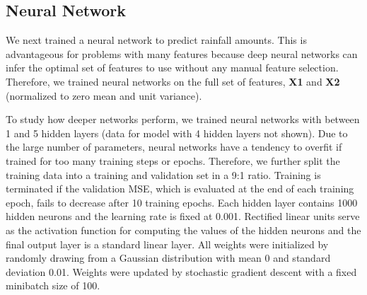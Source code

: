 \documentclass[12pt] {article}
\begin{document}
\subsection{Neural Network}
We next trained a neural network to predict rainfall amounts. This is advantageous for problems with many features because deep neural networks can infer the optimal set of features to use without any manual feature selection. Therefore, we trained neural networks on the full set of features, \textbf{X1} and \textbf{X2} (normalized to zero mean and unit variance).

To study how deeper networks perform, we trained neural networks with between 1 and 5 hidden layers (data for model with 4 hidden layers not shown). Due to the large number of parameters, neural networks have a tendency to overfit if trained for too many training steps or epochs. Therefore, we further split the training data into a training and validation set in a 9:1 ratio. Training is terminated if the validation MSE, which is evaluated at the end of each training epoch, fails to decrease after 10 training epochs. Each hidden layer contains 1000 hidden neurons and the learning rate is fixed at 0.001. Rectified linear units serve as the activation function for computing the values of the hidden neurons and the final output layer is a standard linear layer. All weights were initialized by randomly drawing from a Gaussian distribution with mean 0 and standard deviation 0.01. Weights were updated by stochastic gradient descent with a fixed minibatch size of 100.
\end{document}
